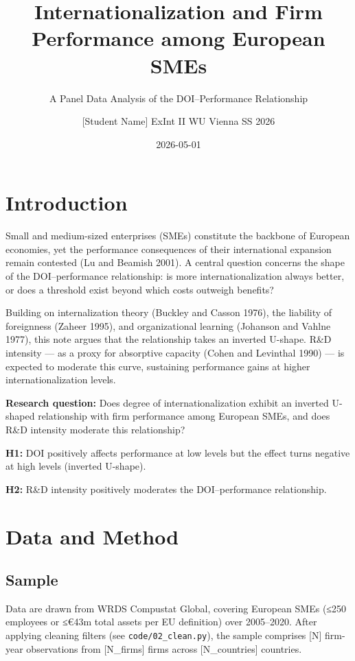 \documentclass[
  11pt,
  letterpaper,
  DIV=11,
  numbers=noendperiod]{scrartcl}
\title{Internationalization and Firm Performance among European SMEs}
\subtitle{A Panel Data Analysis of the DOI--Performance Relationship}
\author{{[}Student Name{]} \textbar{} ExInt II \textbar{} WU Vienna
\textbar{} SS 2026}
\date{2026-05-01}
\begin{document}
\maketitle


\section{Introduction}\label{introduction}

Small and medium-sized enterprises (SMEs) constitute the backbone of
European economies, yet the performance consequences of their
international expansion remain contested (Lu and Beamish 2001). A
central question concerns the shape of the DOI--performance
relationship: is more internationalization always better, or does a
threshold exist beyond which costs outweigh benefits?

Building on internalization theory (Buckley and Casson 1976), the
liability of foreignness (Zaheer 1995), and organizational learning
(Johanson and Vahlne 1977), this note argues that the relationship takes
an inverted U-shape. R\&D intensity --- as a proxy for absorptive
capacity (Cohen and Levinthal 1990) --- is expected to moderate this
curve, sustaining performance gains at higher internationalization
levels.

\textbf{Research question:} Does degree of internationalization exhibit
an inverted U-shaped relationship with firm performance among European
SMEs, and does R\&D intensity moderate this relationship?

\textbf{H1:} DOI positively affects performance at low levels but the
effect turns negative at high levels (inverted U-shape).

\textbf{H2:} R\&D intensity positively moderates the DOI--performance
relationship.

\section{Data and Method}\label{data-and-method}

\subsection{Sample}\label{sample}

Data are drawn from WRDS Compustat Global, covering European SMEs (≤250
employees or ≤€43m total assets per EU definition) over 2005--2020.
After applying cleaning filters (see \texttt{code/02\_clean.py}), the
sample comprises {[}N{]} firm-year observations from {[}N\_firms{]}
firms across {[}N\_countries{]} countries.
\end{document}
